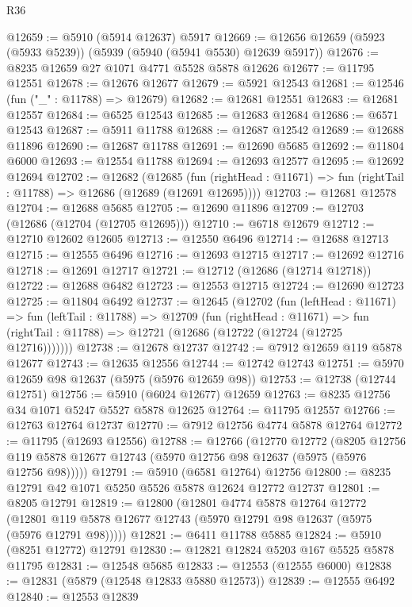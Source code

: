 \begin{lexlean}{R36}
\begin{coremodule}
@12659 := @5910 (@5914 @12637) @5917
@12669 := @12656 @12659 (@5923 (@5933 @5239)) (@5939 (@5940 (@5941 @5530) @12639 @5917))
@12676 := @8235 @12659 @27 @1071 @4771 @5528 @5878 @12626
@12677 := @11795 @12551
@12678 := @12676 @12677
@12679 := @5921 @12543
@12681 := @12546 (fun ("_" : @11788) => @12679)
@12682 := @12681 @12551
@12683 := @12681 @12557
@12684 := @6525 @12543
@12685 := @12683 @12684
@12686 := @6571 @12543
@12687 := @5911 @11788
@12688 := @12687 @12542
@12689 := @12688 @11896
@12690 := @12687 @11788
@12691 := @12690 @5685
@12692 := @11804 @6000
@12693 := @12554 @11788
@12694 := @12693 @12577
@12695 := @12692 @12694
@12702 := @12682
    (@12685
      (fun (rightHead : @11671) => fun (rightTail : @11788) => @12686 (@12689 (@12691 @12695))))
@12703 := @12681 @12578
@12704 := @12688 @5685
@12705 := @12690 @11896
@12709 := @12703 (@12686 (@12704 (@12705 @12695)))
@12710 := @6718 @12679
@12712 := @12710 @12602 @12605
@12713 := @12550 @6496
@12714 := @12688 @12713
@12715 := @12555 @6496
@12716 := @12693 @12715
@12717 := @12692 @12716
@12718 := @12691 @12717
@12721 := @12712 (@12686 (@12714 @12718))
@12722 := @12688 @6482
@12723 := @12553 @12715
@12724 := @12690 @12723
@12725 := @11804 @6492
@12737 := @12645
    (@12702
      (fun (leftHead : @11671) =>
      fun (leftTail : @11788) =>
      @12709
        (fun (rightHead : @11671) =>
        fun (rightTail : @11788) => @12721 (@12686 (@12722 (@12724 (@12725 @12716)))))))
@12738 := @12678 @12737
@12742 := @7912 @12659 @119 @5878 @12677
@12743 := @12635 @12556
@12744 := @12742 @12743
@12751 := @5970 @12659 @98 @12637 (@5975 (@5976 @12659 @98))
@12753 := @12738 (@12744 @12751)
@12756 := @5910 (@6024 @12677) @12659
@12763 := @8235 @12756 @34 @1071 @5247 @5527 @5878 @12625
@12764 := @11795 @12557
@12766 := @12763 @12764 @12737
@12770 := @7912 @12756 @4774 @5878 @12764
@12772 := @11795 (@12693 @12556)
@12788 := @12766
    (@12770
      @12772
      (@8205 @12756 @119 @5878 @12677 @12743 (@5970 @12756 @98 @12637 (@5975 (@5976 @12756 @98)))))
@12791 := @5910 (@6581 @12764) @12756
@12800 := @8235 @12791 @42 @1071 @5250 @5526 @5878 @12624 @12772 @12737
@12801 := @8205 @12791
@12819 := @12800
    (@12801
      @4774
      @5878
      @12764
      @12772
      (@12801 @119 @5878 @12677 @12743 (@5970 @12791 @98 @12637 (@5975 (@5976 @12791 @98)))))
@12821 := @6411 @11788 @5885
@12824 := @5910 (@8251 @12772) @12791
@12830 := @12821 @12824 @5203 @167 @5525 @5878 @11795
@12831 := @12548 @5685
@12833 := @12553 (@12555 @6000)
@12838 := @12831 (@5879 (@12548 @12833 @5880 @12573))
@12839 := @12555 @6492
@12840 := @12553 @12839

\end{coremodule}
\end{lexlean}

